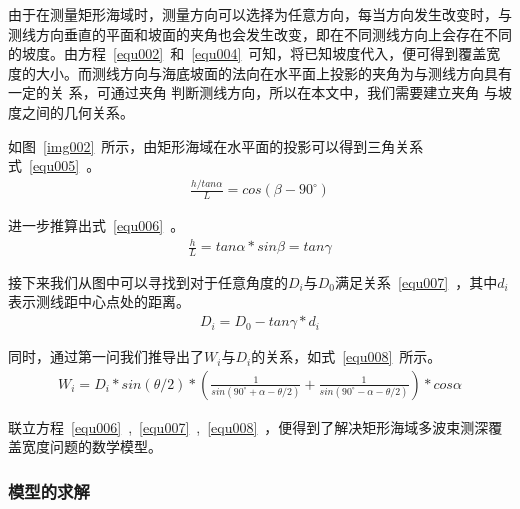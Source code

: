 \documentclass{cumcmthesis}
\begin{document}
由于在测量矩形海域时，测量方向可以选择为任意方向，每当方向发生改变时，与测线方向垂直的平面和坡面的夹角也会发生改变，即在不同测线方向上会存在不同
的坡度。由方程~\ref{equ002}~和~\ref{equ004}~可知，将已知坡度代入，便可得到覆盖宽度的大小。而测线方向与海底坡面的法向在水平面上投影的夹角为与测线方向具有一定的关
系，可通过夹角 判断测线方向，所以在本文中，我们需要建立夹角 与坡度之间的几何关系。

如图~\ref{img002}~所示，由矩形海域在水平面的投影可以得到三角关系式~\ref{equ005}~。
\begin{equation}\label{equ005}
	\begin{aligned}
		\frac{h/tan\alpha}{L}=cos(\beta-90^\circ)
	\end{aligned}
\end{equation}

进一步推算出式~\ref{equ006}~。
\begin{equation}\label{equ006}
	\begin{aligned}
		\frac{h}{L}=tan\alpha*sin\beta=tan\gamma
	\end{aligned}
\end{equation}

接下来我们从图中可以寻找到对于任意角度的$D_i$与$D_0$满足关系~\ref{equ007}~，其中$d_i$表示测线距中心点处的距离。
\begin{equation}\label{equ007}
	\begin{aligned}
		D_i=D_0-tan\gamma*d_i
	\end{aligned}
\end{equation}

同时，通过第一问我们推导出了$W_i$与$D_i$的关系，如式~\ref{equ008}~所示。
\begin{equation}\label{equ008}
	\begin{aligned}
		W_i=D_i*sin(\theta/2)*(\frac{1}{sin(90^\circ+\alpha-\theta/2)}+\frac{1}{sin(90^\circ-\alpha-\theta/2)})*cos\alpha
	\end{aligned}
\end{equation}

联立方程~\ref{equ006}~,~\ref{equ007}~,~\ref{equ008}~，便得到了解决矩形海域多波束测深覆盖宽度问题的数学模型。
\subsubsection{模型的求解}
\end{document}
